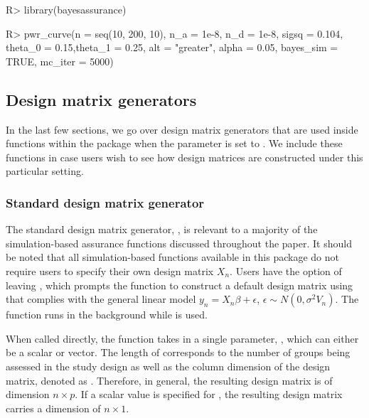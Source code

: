 \begin{Schunk}
\begin{Sin}
R> library(bayesassurance)

R> pwr_curve(n = seq(10, 200, 10), n_a = 1e-8, n_d = 1e-8, 
sigsq = 0.104, theta_0 = 0.15,theta_1 = 0.25, alt = "greater", alpha = 0.05, 
bayes_sim = TRUE, mc_iter = 5000)

\end{Sin}
\end{Schunk}





\subsection{Design matrix generators}\label{design_matrix_generators}
In the last few sections, we go over design matrix generators
that are used inside functions within
the  package when the 
parameter is set to .
We include these functions in case users wish to see 
how design matrices are constructed under this particular
setting. 

\subsubsection{Standard design matrix generator}\label{subsubsec:standard_designmatrix}
The standard design matrix generator, , 
is relevant to a majority of the simulation-based assurance
functions discussed throughout the paper. 
It should be noted that all simulation-based functions
available in this package
do not require users to specify their own
design matrix $X_n$. Users have the option of leaving 
, which prompts the function to construct a 
default design matrix using  that complies
with the general linear model $y_n = X_n\beta +
\epsilon$, $\epsilon \sim N(0, \sigma^2V_n)$. The function
runs in the background while 
 is used.

When called directly, 
the  function takes in a single parameter, 
, which can either be a scalar or vector. 
The length of  corresponds
to the number of groups being assessed in the study design
as well as the column dimension of the design matrix,
denoted as . Therefore, in general, the resulting 
design matrix is of dimension $n \times p$. 
If a scalar value is specified for , 
the resulting design matrix carries a dimension
of $n \times 1$. 

